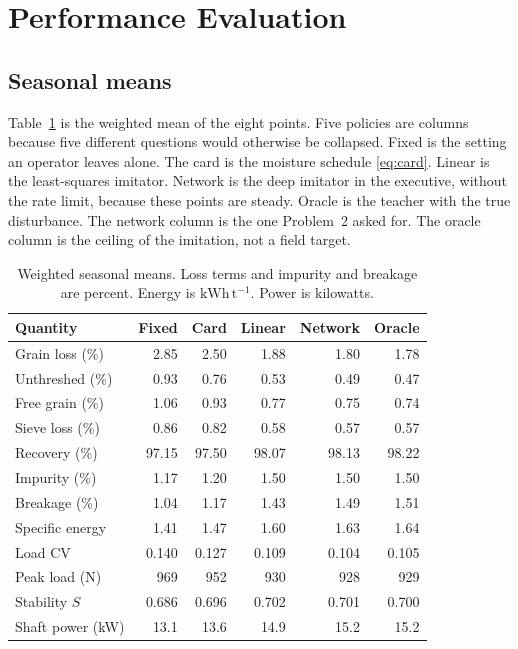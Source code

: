 \section{Performance Evaluation}
\label{sec:eval}

\subsection{Seasonal means}

Table~\ref{tab:season} is the weighted mean of the eight points. Five policies are columns because five different questions would otherwise be collapsed. Fixed is the setting an operator leaves alone. The card is the moisture schedule \eqref{eq:card}. Linear is the least-squares imitator. Network is the deep imitator in the executive, without the rate limit, because these points are steady. Oracle is the teacher with the true disturbance. The network column is the one Problem~2 asked for. The oracle column is the ceiling of the imitation, not a field target.

\begin{table}[ht]
\centering
\caption{Weighted seasonal means. Loss terms and impurity and breakage are percent. Energy is \(\mathrm{kWh\,t^{-1}}\). Power is kilowatts.}
\label{tab:season}
\begin{tabular}{@{}lrrrrr@{}}
\toprule
Quantity & Fixed & Card & Linear & Network & Oracle \\
\midrule
Grain loss (\%) & 2.85 & 2.50 & 1.88 & 1.80 & 1.78 \\
Unthreshed (\%) & 0.93 & 0.76 & 0.53 & 0.49 & 0.47 \\
Free grain (\%) & 1.06 & 0.93 & 0.77 & 0.75 & 0.74 \\
Sieve loss (\%) & 0.86 & 0.82 & 0.58 & 0.57 & 0.57 \\
Recovery (\%) & 97.15 & 97.50 & 98.07 & 98.13 & 98.22 \\
Impurity (\%) & 1.17 & 1.20 & 1.50 & 1.50 & 1.50 \\
Breakage (\%) & 1.04 & 1.17 & 1.43 & 1.49 & 1.51 \\
Specific energy & 1.41 & 1.47 & 1.60 & 1.63 & 1.64 \\
Load CV & 0.140 & 0.127 & 0.109 & 0.104 & 0.105 \\
Peak load (N) & 969 & 952 & 930 & 928 & 929 \\
Stability \(S\) & 0.686 & 0.696 & 0.702 & 0.701 & 0.700 \\
Shaft power (kW) & 13.1 & 13.6 & 14.9 & 15.2 & 15.2 \\
\bottomrule
\end{tabular}
\end{table}

